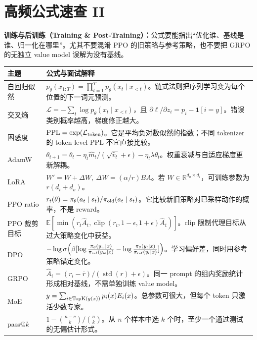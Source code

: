 \chapter{高频公式速查 II}\label{sec:formula-cheatsheet-training}

\begin{takeawaybox}
\textbf{训练与后训练（Training \& Post-Training）：}公式要能指出“优化谁、基线是谁、归一化在哪里”。尤其不要混淆 PPO 的旧策略与参考策略，也不要把 GRPO 的无独立 value model 误解为没有基线。
\end{takeawaybox}

\renewcommand{\arraystretch}{1.16}
\noindent\begin{tabularx}{\textwidth}{p{}Y}
\toprule
主题 & 公式与面试解释\\
\midrule
自回归似然 & $p_\theta(x_{1:T})=\prod_{t=1}^{T}p_\theta(x_t\mid x_{<t})$。链式法则把序列学习变为每个位置的下一词元预测。\\[0.4em]
交叉熵 & $\mathcal L=-\sum_t\log p_\theta(x_t\mid x_{<t})$，且 $\partial\ell/\partial z_i=p_i-\mathbf 1[i=y]$。错误类别概率越高，梯度修正越大。\\[0.4em]
困惑度 & $\operatorname{PPL}=\exp(\mathcal L_{\rm token})$。它是平均负对数似然的指数；不同 tokenizer 的 token-level PPL 不宜直接比较。\\[0.4em]
AdamW & $\theta_{t+1}=\theta_t-\eta_t\hat m_t/(\sqrt{\hat v_t}+\epsilon)-\eta_t\lambda\theta_t$。权重衰减与自适应梯度更新解耦。\\[0.4em]
LoRA & $W'=W+\Delta W,\ \Delta W=(\alpha/r)BA$。若 $W\in\mathbb R^{d_o\times d_i}$，可训练参数为 $r(d_i+d_o)$。\\[0.4em]
PPO ratio & $r_t(\theta)=\pi_\theta(a_t\mid s_t)/\pi_{\rm old}(a_t\mid s_t)$。它比较新旧策略对已采样动作的概率，不是 reward。\\[0.4em]
PPO 裁剪目标 & $\mathbb E[\min(r_t\hat A_t,\operatorname{clip}(r_t,1-\epsilon,1+\epsilon)\hat A_t)]$。clip 限制代理目标从过大策略变化中获益。\\[0.4em]
DPO & $-\log\sigma\!\left(\beta[\log\frac{\pi_\theta(y_w|x)}{\pi_{\rm ref}(y_w|x)}-\log\frac{\pi_\theta(y_l|x)}{\pi_{\rm ref}(y_l|x)}]\right)$。学习偏好差，同时用参考策略锚定变化。\\[0.4em]
GRPO & $\hat A_i=(r_i-\bar r)/(\operatorname{std}(r)+\epsilon)$。同一 prompt 的组内奖励统计形成相对基线，不需单独训练 value model。\\[0.4em]
MoE & $y=\sum_{i\in\operatorname{TopK}(g(x))}p_i(x)E_i(x)$。总参数可很大，但每个 token 只激活少数专家。\\[0.4em]
pass@$k$ & $1-\binom{n-c}{k}/\binom{n}{k}$。从 $n$ 个样本中选 $k$ 个时，至少一个通过测试的无偏估计形式。\\
\bottomrule
\end{tabularx}

